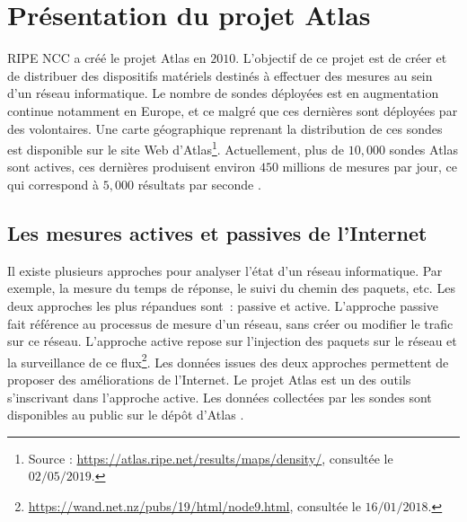 \section{Présentation du projet  Atlas} \label{ripeatlassection}
RIPE NCC a créé le projet  Atlas en $2010$. L'objectif de ce projet est de créer et de distribuer des dispositifs matériels destinés à effectuer des mesures au sein d'un réseau informatique.  Le nombre de sondes déployées est en augmentation continue notamment en Europe, et ce malgré que ces dernières sont déployées par des volontaires. Une carte géographique reprenant la distribution de ces sondes est disponible sur le site Web d'Atlas\footnote{Source : \url{https://atlas.ripe.net/results/maps/density/}, consultée le $02/05/2019$.}.
Actuellement,  plus de $10,000$ sondes Atlas sont actives, ces dernières produisent environ $450$ millions de mesures par jour, ce qui correspond à  $5,000$ résultats par seconde \cite{WinNT}.


\subsection{Les mesures  actives et passives de l'Internet}
Il existe plusieurs approches pour analyser l'état  d'un réseau informatique. Par exemple, la mesure du temps de réponse, le suivi du chemin des paquets, etc.  Les deux approches les plus répandues sont~:   passive et active. L'approche passive fait référence au processus de mesure d'un réseau, sans créer ou modifier le trafic sur ce réseau.   L'approche active  repose sur l'injection des paquets  sur le réseau et la surveillance  de ce flux\footnote{\url{https://wand.net.nz/pubs/19/html/node9.html}, consultée le $16/01/2018$.}.
Les données issues des deux approches permettent de  proposer des améliorations de l'Internet. Le projet  Atlas est un des outils s'inscrivant dans l'approche active.  Les données collectées par les sondes sont disponibles au public sur le dépôt d'Atlas \cite{ripe-atlas-data}.



